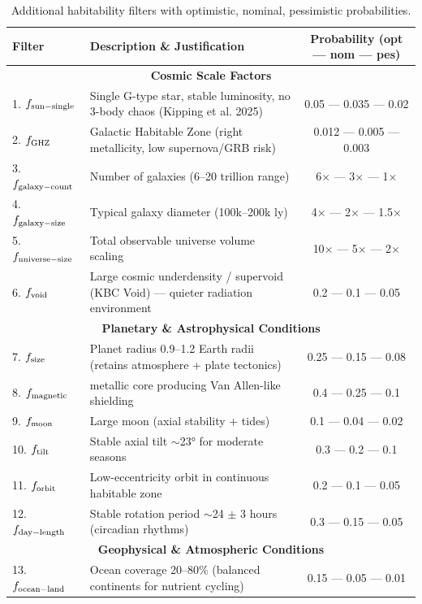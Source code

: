 \documentclass[12pt]{article}
\begin{document}
\begin{table}[H]
\centering
\footnotesize
\raggedright
\setlength{\tabcolsep}{2.5pt}
\caption{Additional habitability filters with optimistic, nominal, pessimistic probabilities.}
\begin{tabular}{l p{} c}
\toprule
\textbf{Filter} & \textbf{Description \& Justification} & \textbf{Probability (opt — nom — pes)} \\
\midrule
\multicolumn{3}{c}{\textbf{Cosmic Scale Factors}} \\
\midrule
1. $f_{\rm sun-single}$ & Single G-type star, stable luminosity, no 3-body chaos (Kipping et al. 2025) & 0.05 — 0.035 — 0.02 \\
2. $f_{\rm GHZ}$ & Galactic Habitable Zone (right metallicity, low supernova/GRB risk) & 0.012 — 0.005 — 0.003 \\
3. $f_{\rm galaxy-count}$ & Number of galaxies (6--20 trillion range) & 6$\times$ — 3$\times$ — 1$\times$ \\
4. $f_{\rm galaxy-size}$ & Typical galaxy diameter (100k--200k ly) & 4$\times$ — 2$\times$ — 1.5$\times$ \\
5. $f_{\rm universe-size}$ & Total observable universe volume scaling & 10$\times$ — 5$\times$ — 2$\times$ \\
6. $f_{\rm void}$ & Large cosmic underdensity / supervoid (KBC Void) — quieter radiation environment & 0.2 — 0.1 — 0.05 \\
\midrule
\multicolumn{3}{c}{\textbf{Planetary \& Astrophysical Conditions}} \\
\midrule
7. $f_{\rm size}$ & Planet radius 0.9--1.2 Earth radii (retains atmosphere + plate tectonics) & 0.25 — 0.15 — 0.08 \\
8. $f_{\rm magnetic}$ & metallic core producing Van Allen-like shielding & 0.4 — 0.25 — 0.1 \\
9. $f_{\rm moon}$ & Large moon (axial stability + tides) & 0.1 — 0.04 — 0.02 \\
10. $f_{\rm tilt}$ & Stable axial tilt $\sim$23° for moderate seasons & 0.3 — 0.2 — 0.1 \\
11. $f_{\rm orbit}$ & Low-eccentricity orbit in continuous habitable zone & 0.2 — 0.1 — 0.05 \\
12. $f_{\rm day-length}$ & Stable rotation period $\sim$24 $\pm$ 3 hours (circadian rhythms) & 0.3 — 0.15 — 0.05 \\
\midrule
\multicolumn{3}{c}{\textbf{Geophysical \& Atmospheric Conditions}} \\
\midrule
13. $f_{\rm ocean-land}$ & Ocean coverage 20--80\% (balanced continents for nutrient cycling) & 0.15 — 0.05 — 0.01 \\

\end{tabular}
\end{table}
\end{document}
